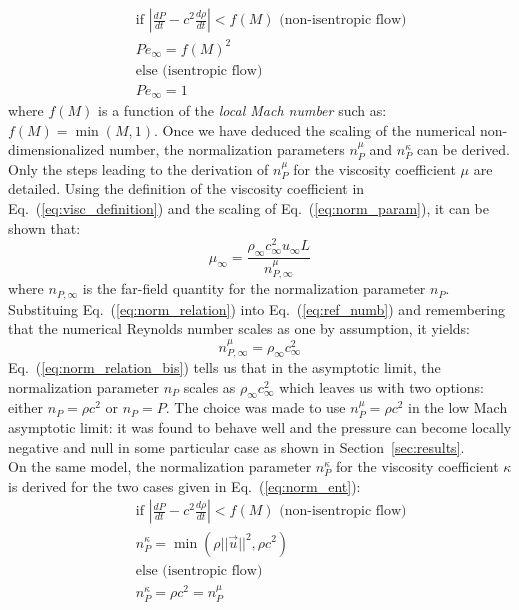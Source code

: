 \documentclass[preprint,10pt]{elsarticle}
\newcommand{\eqt}[1]{Eq.~(\ref{#1})}                     %
\newcommand{\sct}[1]{Section~\ref{#1}}                   %
\begin{document}
\begin{eqnarray}  \label{eq:norm_ent}
&&\text{if } \left| \frac{dP}{dt} - c^2 \frac{d \rho}{dt} \right| < f(M) \text{ (non-isentropic flow)}\nonumber \\
&&Pe_{\infty} = f(M)^2 \nonumber \\
&&\text{else (isentropic flow)}\\
&&Pe_{\infty} = 1 \nonumber
\end{eqnarray}
where $f(M)$ is a function of the \emph{local Mach number} such as: $f(M) = \min (M, 1)$. Once we have deduced the scaling of the numerical non-dimensionalized number, the normalization parameters $n_P^{\mu}$ and $n_P^{\kappa}$ can be derived. Only the steps leading to the derivation of $n_P^{\mu}$ for the viscosity coefficient $\mu$ are detailed. Using the definition of the viscosity coefficient in \eqt{eq:visc_definition} and the scaling of \eqt{eq:norm_param}, it can be shown that:
\begin{equation}
\label{eq:norm_relation}
\mu_{\infty} = \frac{ \rho_{\infty} c_{\infty}^2 u_{\infty} L }{ n_{P,\infty}^{\mu} } 
\end{equation}
where $n_{P,\infty}$ is the far-field quantity for the normalization parameter $n_P$. Substituing \eqt{eq:norm_relation} into \eqt{eq:ref_numb} and remembering that the numerical Reynolds number scales as one by assumption, it yields:
\begin{equation}
\label{eq:norm_relation_bis}
n_{P,\infty}^{\mu} = \rho_{\infty} c_{\infty}^2
\end{equation}
\eqt{eq:norm_relation_bis} tells us that in the asymptotic limit, the normalization parameter $n_P$ scales as $\rho_{\infty} c_{\infty}^2$ which leaves us with two options:
either $n_P = \rho c^2$ or $n_P = P$. The choice was made to use $n_P^{\mu} = \rho c^2$ in the low Mach asymptotic limit: it was found to behave well and the pressure can become locally negative and null in some particular case as shown in \sct{sec:results}. \\
On the same model, the normalization parameter $n_P^{\kappa}$ for the viscosity coefficient $\kappa$ is derived for the two cases given in \eqt{eq:norm_ent}:
\begin{eqnarray}  \label{eq:norm_ent2}
&&\text{if } \left| \frac{dP}{dt} - c^2 \frac{d \rho}{dt}\right| < f(M) \text{ (non-isentropic flow)}\nonumber \\
&&n_{P}^{\kappa} =\min( \rho ||\vec{u} ||^2, \rho c^2  ) \nonumber \\
&&\text{else (isentropic flow)}\\
&&n_{P}^{\kappa} = \rho c^2 = n_{P}^{\mu} \nonumber
\end{eqnarray}
\end{document}
